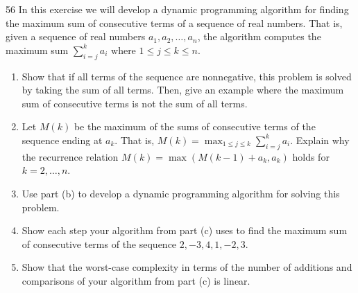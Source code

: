\documentclass[11pt]{article}
\begin{document}
\begin{exercise}{56}
    In this exercise we will develop a dynamic programming algorithm
    for finding the maximum sum of consecutive terms of a sequence of
    real numbers. That is, given a sequence of real numbers
    $a_1, a_2, \dots, a_n$, the algorithm computes the maximum sum
    $\sum_{i=j}^{k} a_i$ where $1 \leq j \leq k \leq n$.
    \begin{enumerate}[label=(\alph*)]
        \item Show that if all terms of the sequence are nonnegative,
        this problem is solved by taking the sum of all terms. Then,
        give an example where the maximum sum of consecutive terms is
        not the sum of all terms.
        \item Let $M(k)$ be the maximum of the sums of consecutive
        terms of the sequence ending at $a_k$. That is,
        $M(k) = \max_{1 \leq j \leq k} \sum_{i=j}^{k} a_i$. Explain
        why the recurrence relation $M(k) = \max(M(k-1)+a_k, a_k)$
        holds for $k = 2, \dots, n$.
        \item Use part (b) to develop a dynamic programming algorithm
        for solving this problem.
        \item Show each step your algorithm from part (c) uses to
        find the maximum sum of consecutive terms of the sequence
        $2, -3, 4, 1, -2, 3$.
        \item Show that the worst-case complexity in terms of the
        number of additions and comparisons of your algorithm from
        part (c) is linear.
    \end{enumerate}
\end{exercise}
\end{document}
